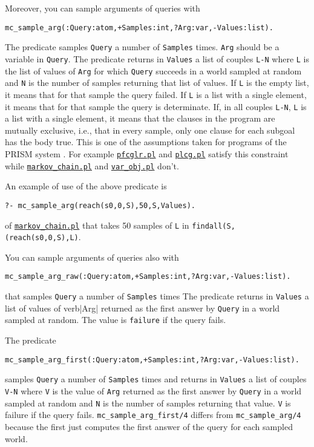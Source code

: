 Moreover, you can sample arguments of queries with
\begin{verbatim}
mc_sample_arg(:Query:atom,+Samples:int,?Arg:var,-Values:list).
\end{verbatim}
The predicate samples \verb|Query| a number of \verb|Samples| times. 
\verb|Arg| should be a variable in \verb|Query|.
The predicate returns in \verb|Values| a list of couples \verb|L-N| where
\verb|L| is the list of values of \verb|Arg| for which \verb|Query|
succeeds in a world sampled at random and \verb|N|
is the number of samples returning that list of values.
If \verb|L| is the empty list, it means that for that
sample the query failed. 
If \verb|L| is a list with a 
single element, it means that for that sample the query is 
determinate. 
If, in all couples \verb|L-N|, \verb|L| 
is a list with a 
single element, it means that the clauses in the program 
are mutually exclusive, i.e., that in every sample, only
one clause for each subgoal has the body true. This is one
of the assumptions taken for programs of the PRISM system \cite{DBLP:journals/jair/SatoK01}.
For example
\href{http://cplint.lamping.unife.it/example/inference/pfcglr.pl}{\texttt{pfcglr.pl}} and \href{http://cplint.lamping.unife.it/example/inference/plcg.pl}{\texttt{plcg.pl}} satisfy this constraint while
 \href{http://cplint.lamping.unife.it/example/inference/markov_chain.pl}{\texttt{markov\_chain.pl}} and \href{http://cplint.lamping.unife.it/example/inference/var_obj.pl}{\texttt{var\_obj.pl}} don't.


An example of use of the above predicate is
\begin{verbatim}
?- mc_sample_arg(reach(s0,0,S),50,S,Values). 
\end{verbatim}
of \href{http://cplint.lamping.unife.it/example/inference/markov_chain.pl}{\texttt{markov\_chain.pl}}
that takes 50 samples of \verb|L| in \verb|findall(S,(reach(s0,0,S),L)|.

You can sample arguments of queries also with
\begin{verbatim}
mc_sample_arg_raw(:Query:atom,+Samples:int,?Arg:var,-Values:list).
\end{verbatim}
that samples \verb|Query| a number of \verb|Samples| times 
The predicate returns in \verb|Values| a list of values
of verb|Arg|  returned as the first answer by \verb|Query|  in
a world sampled at random.
The value is \verb|failure| if the query fails.

The predicate
\begin{verbatim}
mc_sample_arg_first(:Query:atom,+Samples:int,?Arg:var,-Values:list).
\end{verbatim}
samples \verb|Query| a number of \verb|Samples| times 
and returns in \verb|Values| a list of couples \verb|V-N| where 
\verb|V| is the value of \verb|Arg| returned as the first answer by \verb|Query| in 
a world sampled at random and \verb|N| is the number of samples
returning that value.
\verb|V| is failure if the query fails.
\verb|mc_sample_arg_first/4| differs from \verb|mc_sample_arg/4| because the first just computes the first
answer of the query for each sampled world.


